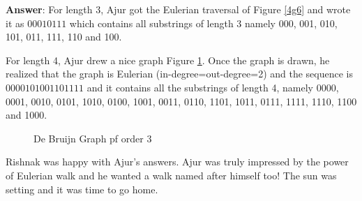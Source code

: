 \textbf{Answer}: For length 3, Ajur got the Eulerian traversal of Figure \ref{4g6} and wrote it as
$00010111$ which contains all substrings of length 3 namely 000, 001, 010, 101, 011, 111, 110 and 100.

For length 4, Ajur drew a nice graph Figure \ref{4a1}. Once the graph is drawn, he realized that the graph is Eulerian (in-degree=out-degree=2) and the sequence is $0000101001101111$ and it contains all the substrings of length 4, namely 0000, 0001, 0010, 0101, 1010, 0100, 1001, 0011,  0110, 1101, 1011, 0111, 1111, 1110, 1100 and 1000. 

\begin{figure}
\begin{center}
\caption{ De Bruijn Graph pf order 3}\label{4a1}
\end{center}
\end{figure}

Rishnak was happy with Ajur's answers. 
Ajur was truly impressed by the power of Eulerian walk and he wanted a walk named after himself too! The sun was setting and it was time to go home.